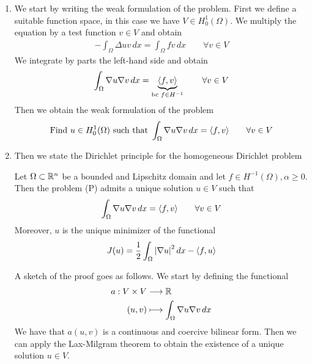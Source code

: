 \begin{enumerate}
    \item We start by writing the weak formulation of the problem. First we define a
          suitable function space, in this case we have \(V \in H^1_0(\Omega)\). We
          multiply the equation by a test function \(v \in V\) and obtain
          \[
              \begin{split}
                  -\int_\Omega \Delta u v \, dx = \int_\Omega f v \, dx \qquad \forall v \in V
              \end{split}
          \]
          We integrate by parts the left-hand side and obtain
          \[
              \begin{split}
                  \int_\Omega \nabla u \nabla v \, dx = \underbrace{\langle f, v \rangle}_{\text{bc } f \in H^{-1}} \qquad \forall v \in V
              \end{split}
          \]
          Then we obtain the weak formulation of the problem
          \[
              \begin{split}
                  \text{Find } u \in H^1_0(\Omega) \text{ such that } \int_\Omega \nabla u \nabla v \, dx =  \langle f, v \rangle \qquad \forall v \in V
              \end{split}
          \]
    \item Then we state the Dirichlet principle for the homogeneous Dirichlet problem
          \begin{remark}
              Let \(\Omega \subset \mathbb{R}^n\) be a bounded and Lipschitz domain and let \(f \in H^{-1}(\Omega), \alpha \geq 0\). Then the problem (P) admits a unique solution \(u \in V\) such that
              \[
                  \int_\Omega \nabla u \nabla v \, dx = \langle f, v \rangle \qquad \forall v \in V
              \]
              Moreover, \(u\) is the unique minimizer of the functional
              \[
                  J(u) = \frac{1}{2} \int_\Omega \abs{\nabla u}^2 \, dx - \langle f, u \rangle
              \]
          \end{remark}
          A sketch of the proof goes as follows. We start by defining the functional
          \begin{align*}
              a: V \times V & \longrightarrow \mathbb{R}                         \\
              (u, v)        & \longmapsto \int_\Omega \nabla u \nabla v \, dx
          \end{align*}
          We have that \(a(u,v)\) is a continuous and coercive bilinear form. Then we can apply the Lax-Milgram theorem to obtain the existence of a unique solution \(u \in V\).


\end{enumerate}
